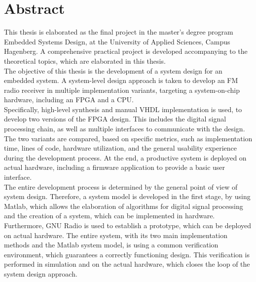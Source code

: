 \chapter{Abstract}


This thesis is elaborated as the final project in the master's degree program Embedded Systems Design, at the University of Applied Sciences, Campus Hagenberg.
A comprehensive practical project is developed accompanying to the theoretical topics, which are elaborated in this thesis.\\

The objective of this thesis is the development of a system design for an embedded system.
A system-level design approach is taken to develop an FM radio receiver in multiple implementation variants, targeting a system-on-chip hardware, including an FPGA and a CPU.\\

Specifically, high-level synthesis and manual VHDL implementation is used, to develop two versions of the FPGA design.
This includes the digital signal processing chain, as well as multiple interfaces to communicate with the design.
The two variants are compared, based on specific metrics, such as implementation time, lines of code, hardware utilization, and the general usability experience during the development process.
At the end, a productive system is deployed on actual hardware, including a firmware application to provide a basic user interface.\\

The entire development process is determined by the general point of view of system design.
Therefore, a system model is developed in the first stage, by using Matlab, which allows the elaboration of algorithms for digital signal processing and the creation of a system, which can be implemented in hardware.
Furthermore, GNU Radio is used to establish a prototype, which can be deployed on actual hardware.
The entire system, with its two main implementation methods and the Matlab system model, is using a common verification environment, which guarantees a correctly functioning design.
This verification is performed in simulation and on the actual hardware, which closes the loop of the system design approach.
